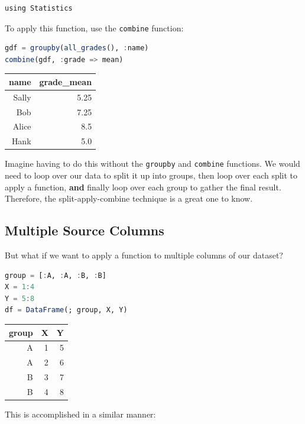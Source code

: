 \documentclass[
  notoc %
]{tufte-book}
\newcommand{\passthrough}[1]{#1}
\begin{document}
\begin{lstlisting}
using Statistics
\end{lstlisting}

To apply this function, use the \passthrough{\lstinline!combine!}
function:

\begin{lstlisting}[language=Julia]
gdf = groupby(all_grades(), :name)
combine(gdf, :grade => mean)
\end{lstlisting}

\begin{longtable}[]{@{}rr@{}}
\toprule
name & grade\_mean \\
\midrule
\endhead
Sally & 5.25 \\
Bob & 7.25 \\
Alice & 8.5 \\
Hank & 5.0 \\
\bottomrule
\end{longtable}

Imagine having to do this without the \passthrough{\lstinline!groupby!}
and \passthrough{\lstinline!combine!} functions. We would need to loop
over our data to split it up into groups, then loop over each split to
apply a function, \textbf{and} finally loop over each group to gather
the final result. Therefore, the split-apply-combine technique is a
great one to know.

\hypertarget{sec:groupby_combine_multiple_source}{%
\subsection{Multiple Source
Columns}\label{sec:groupby_combine_multiple_source}}

But what if we want to apply a function to multiple columns of our
dataset?

\begin{lstlisting}[language=Julia]
group = [:A, :A, :B, :B]
X = 1:4
Y = 5:8
df = DataFrame(; group, X, Y)
\end{lstlisting}

\begin{longtable}[]{@{}rrr@{}}
\toprule
group & X & Y \\
\midrule
\endhead
A & 1 & 5 \\
A & 2 & 6 \\
B & 3 & 7 \\
B & 4 & 8 \\
\bottomrule
\end{longtable}

This is accomplished in a similar manner:
\end{document}
